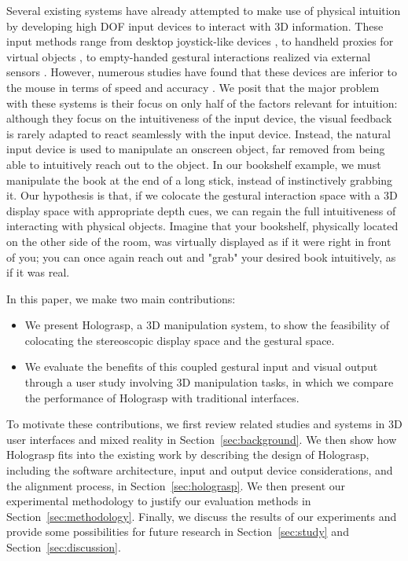 \documentclass[pageno]{jpaper}
\begin{document}
Several existing systems have already attempted to make use of physical intuition by developing high DOF input 
devices to interact with 3D information. These input methods range from desktop joystick-like
devices \cite{mattheiss2011navigating}, to handheld proxies for virtual objects \cite{mine1997moving}, to empty-handed gestural interactions realized via 
external sensors \cite{manders2010gesture}.
However, numerous studies have found that these devices are inferior to the mouse in terms of speed and accuracy \cite{mattheiss2011navigating, study1}.
We posit that the major problem with these systems is their focus on only half of the factors relevant for intuition: although they focus on the intuitiveness of 
the input device, the visual feedback is rarely adapted to react seamlessly with the input device. Instead, the natural input device is used to manipulate an onscreen object, far
removed from being able to intuitively reach out to the object. In our bookshelf example, we must manipulate the book at the end of a long stick, instead of
instinctively grabbing it. Our hypothesis is that, if we colocate the gestural interaction space with a 3D display space with appropriate depth cues, we can regain
the full intuitiveness of interacting with physical objects. Imagine that your bookshelf, physically located on the other side of the room, was virtually displayed as if it were right
in front of you; you can once again reach out and "grab" your desired book intuitively, as if it was real.

In this paper, we make two main contributions:
\begin{itemize}
\item We present Holograsp, a 3D manipulation system, to show the feasibility of colocating the stereoscopic display space and the gestural space.
\item We evaluate  the benefits of this coupled gestural input and visual output through a user study involving 3D manipulation tasks, in which we compare the
performance of Holograsp with traditional interfaces.
\end{itemize}

To motivate these contributions, we first review related studies and systems in 3D user interfaces and mixed reality in Section~\ref{sec:background}. We then show how Holograsp fits
into the existing work by describing the design of Holograsp, including the software architecture, input and output device considerations,
and the alignment process, in Section~\ref{sec:holograsp}. We then present our experimental methodology to justify our evaluation methods in Section~\ref{sec:methodology}. 
Finally, we discuss the results
of our experiments and provide some possibilities for future research in Section~\ref{sec:study} and Section~\ref{sec:discussion}. 
\end{document}
